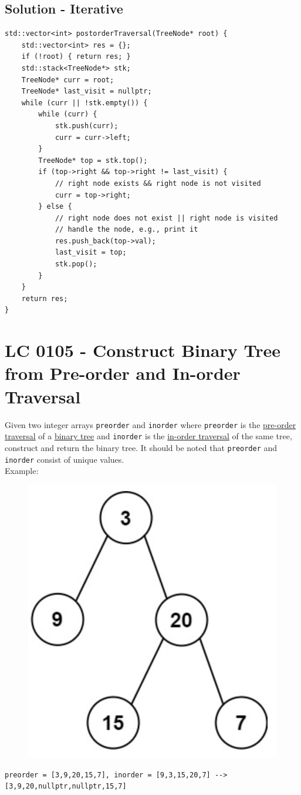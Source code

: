 \subsection*{Solution - Iterative}
\begin{lstlisting}
std::vector<int> postorderTraversal(TreeNode* root) {
	std::vector<int> res = {};
	if (!root) { return res; }
	std::stack<TreeNode*> stk;
	TreeNode* curr = root;
	TreeNode* last_visit = nullptr;
	while (curr || !stk.empty()) {
		while (curr) {
			stk.push(curr);
			curr = curr->left;
		}
		TreeNode* top = stk.top();
		if (top->right && top->right != last_visit) {
			// right node exists && right node is not visited
			curr = top->right;
		} else {
			// right node does not exist || right node is visited
			// handle the node, e.g., print it
			res.push_back(top->val);
			last_visit = top;
			stk.pop();
		}
	}
	return res;
}
\end{lstlisting}

\section{LC 0105 - Construct Binary Tree from Pre-order and In-order Traversal}
Given two integer arrays {\colorbox{CodeBackground}{\lstinline|preorder|}} and {\colorbox{CodeBackground}{\lstinline|inorder|}} where {\colorbox{CodeBackground}{\lstinline|preorder|}} is the \ul{pre-order traversal} of a \ul{binary tree} and {\colorbox{CodeBackground}{\lstinline|inorder|}} is the \ul{in-order traversal} of the same tree, construct and return the binary tree. It should be noted that {\colorbox{CodeBackground}{\lstinline|preorder|}} and {\colorbox{CodeBackground}{\lstinline|inorder|}} consist of unique values. \\

Example:
\begin{figure}[H]
	\centering
	\includegraphics[width=0.23\linewidth]{images/lc0105_example}
	\label{fig:lc0105example}
\end{figure}
{\colorbox{CodeBackground}{\lstinline|preorder = [3,9,20,15,7], inorder = [9,3,15,20,7] --> [3,9,20,nullptr,nullptr,15,7]|}}

